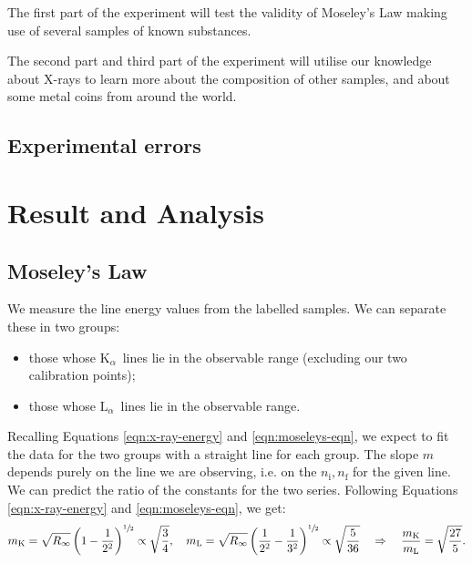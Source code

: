 \documentclass[11pt,a4paper,twoside,onecolumn]{article}
\newcommand{\rydberg}{R}
\newcommand{\Kalpha}{$\mathrm{K}_\alpha$~}
\newcommand{\Lalpha}{$\mathrm{L}_\alpha$~}
\begin{document}
The first part of the experiment will test the validity of Moseley's Law making use of several samples of known substances.

The second part and third part of the experiment will utilise our knowledge about X-rays to learn more about the composition of other samples, and about some metal coins from around the world.

\subsection{Experimental errors}

\section{Result and Analysis}

\subsection{Moseley's Law}
We measure the line energy values from the labelled samples. We can separate these in two groups:
\begin{itemize}[noitemsep]
    \item those whose \Kalpha lines lie in the observable range (excluding our two calibration points);
    \item those whose \Lalpha lines lie in the observable range.
\end{itemize}
Recalling Equations \eqref{eqn:x-ray-energy} and \eqref{eqn:moseleys-eqn}, we expect to fit the data for the two groups with a straight line for each group. The slope $m$ depends purely on the line we are observing, i.e. on the $n_\mathrm{i}, n_\mathrm{f}$ for the given line. We can predict the ratio of the constants for the two series. Following Equations \eqref{eqn:x-ray-energy} and \eqref{eqn:moseleys-eqn}, we get:
\begin{equation}
    m_\mathrm{K} = \sqrt{\rydberg_\infty} \left(1 - \frac{1}{2^2}\right)^{\sfrac{1}{2}} \propto \sqrt{\frac{3}{4}},\quad m_\mathrm{L} = \sqrt{\rydberg_\infty} \left(\frac{1}{2^2} - \frac{1}{3^2}\right)^{\sfrac{1}{2}} \propto \sqrt{\frac{5}{36}} \quad \Rightarrow \quad \frac{m_\mathrm{K}}{m_\mathrm{L}} = \sqrt{\frac{27}{5}}.
\end{equation}
\end{document}
